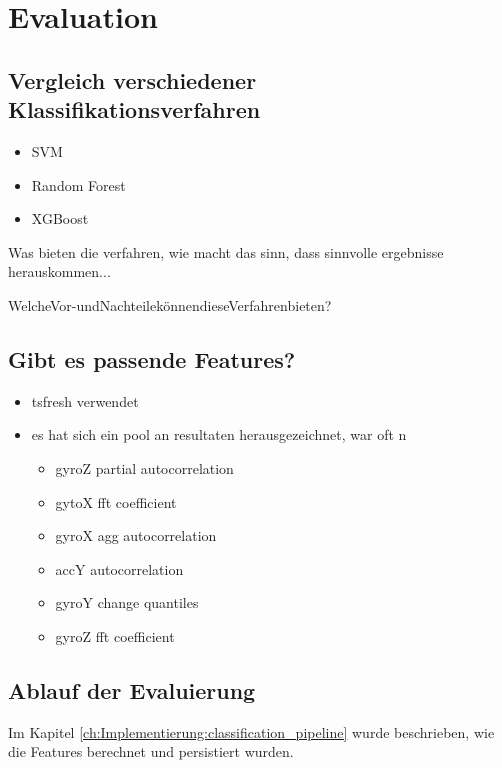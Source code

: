 
\chapter{Evaluation}
\label{ch:Evaluation}

\section{Vergleich verschiedener Klassifikationsverfahren}
\begin{itemize}
    \item SVM
    \item Random Forest
    \item XGBoost
\end{itemize}

Was bieten die verfahren, wie macht das sinn, dass sinnvolle ergebnisse herauskommen...

WelcheVor-undNachteilekönnendieseVerfahrenbieten?

\section{Gibt es passende Features?}
\begin{itemize}
    \item tsfresh verwendet
    \item es hat sich ein pool an resultaten herausgezeichnet, war oft n 
    \begin{itemize}
        \item gyroZ partial autocorrelation
        \item gytoX fft coefficient
        \item gyroX agg autocorrelation
        \item accY autocorrelation
        \item gyroY change quantiles 
        \item gyroZ fft coefficient
    \end{itemize}
\end{itemize}

\section{Ablauf der Evaluierung}
Im Kapitel \ref{ch:Implementierung:classification_pipeline} wurde beschrieben, wie die Features berechnet und persistiert wurden. 

